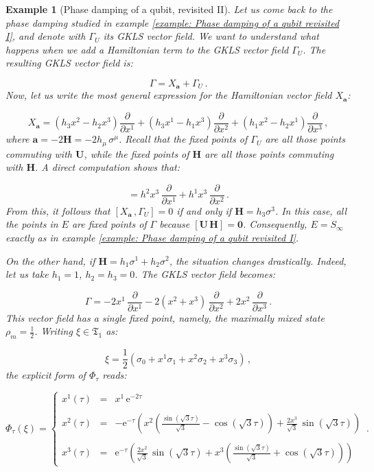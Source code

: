 \documentclass[11pt]{article}
\newcommand{\be}{\begin{equation}}
\newcommand{\ee}{\end{equation}}
\newtheorem{exmp}{Example}
\begin{document}
\begin{exmp}[Phase damping of a qubit, revisited II]
Let us come back to the phase damping studied in example \ref{example: Phase damping of a qubit revisited I}, and denote with $\Gamma_{U}$ its GKLS vector field.
We want to understand what happens when we add a Hamiltonian term to the GKLS vector field $\Gamma_{U}$.
The resulting GKLS vector field is:

\be
\Gamma = X_{\mathbf{a}} + \Gamma_{U}\,.
\ee
Now, let us write the most general expression for the Hamiltonian vector field $X_{\mathbf{a}}$:

\be
X_{\mathbf{a}}=\left(h_{3} x^{2} - h_{2}x^{3} \right)\frac{\partial}{\partial x^{1}} + \left(h_{3} x^{1} - h_{1}x^{3}\right)\frac{\partial}{\partial x^{2}} + \left(h_{1} x^{2} - h_{2}x^{1}\right)\frac{\partial}{\partial x^{3}}\,,
\ee
where $\mathbf{a}=-2\mathbf{H}=-2h_{\mu}\,\sigma^{\mu}$.
Recall that the fixed points of $\Gamma_{U}$ are all those points commuting with $\mathbf{U}$, while the fixed points of $\mathbf{H}$ are all those points commuting with $\mathbf{H}$.
A direct computation shows that:

\be
[X_{\mathbf{a}}\,,\Gamma_{U}]=h^{2}x^{3}\,\frac{\partial}{\partial x^{1}} + h^{1}x^{3}\,\frac{\partial}{\partial x^{2}}\,.
\ee
From this, it follows that $[X_{\mathbf{a}}\,,\Gamma_{U}]=0$ if and only if $\mathbf{H}=h_{3}\sigma^{3}$.
In this case, all the points in $E$ are fixed points of $\Gamma$ because $[\mathbf{U}\,\mathbf{H}]=\mathbf{0}$.
Consequently, $E=S_{\infty}$ exactly as in example \ref{example: Phase damping of a qubit revisited I}.

On the other hand, if $\mathbf{H}=h_{1}\sigma^{1} + h_{2}\sigma^{2}$, the situation changes drastically.
Indeed, let us take $h_{1}=1$, $h_{2}=h_{3}=0$.
The GKLS vector field becomes:

\be
\Gamma = -2x^{1}\,\frac{\partial}{\partial x^{1}}   -2\left(x^{2} + x^{3}\right)\,\frac{\partial}{\partial x^{2}} + 2x^{2}\,\frac{\partial}{\partial x^{3}}\,.
\ee
This vector field has a single fixed point, namely, the maximally mixed state $\rho_{m}=\frac{\mathbb{I}}{2}$.
Writing $\xi\in\mathfrak{T}_{1}$ as:

$$
\xi=\frac{1}{2}\left(\sigma_{0} + x^{1}\sigma_{1} + x^{2}\sigma_{2} + x^{3}\sigma_{3}\right)\,,
$$
the explicit form of $\Phi_{\tau}$ reads:

\be
\Phi_{\tau}(\xi)=\left\{\begin{array}{ccl} 
x^{1}(\tau) & = & x^{1}\,\mathrm{e}^{-2\tau} \\
 & & \\ 
x^{2}(\tau) & = & -\mathrm{e}^{-\tau}\left(x^{2}\left(\frac{\sin(\sqrt{3}\tau)}{\sqrt{3}} - \cos(\sqrt{3}\tau)\right) + \frac{2 x^{3}}{\sqrt{3}}\,\sin(\sqrt{3}\tau)\right) \\
 & & \\
x^{3}(\tau) & = & \mathrm{e}^{-\tau}\left(\frac{2 x^{2}}{\sqrt{3}}\,\sin(\sqrt{3}\tau) + x^{3}\left(\frac{\sin(\sqrt{3}\tau)}{\sqrt{3}} + \cos(\sqrt{3}\tau)\right)\right) 
\end{array}\right.\,.
\ee


\end{exmp}
\end{document}
